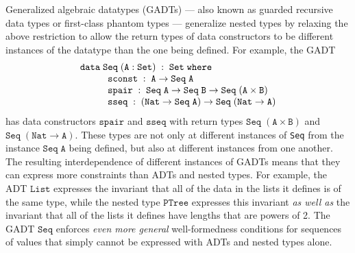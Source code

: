 \documentclass{lmcs}
\theoremstyle{plain}\newtheorem{satz}[thm]{Satz}
\begin{document}
Generalized algebraic datatypes (GADTs) --- also known as guarded
recursive data types or first-class phantom types --- generalize
nested types by relaxing the above restriction to allow the return
types of data constructors to be different instances of the datatype
than the one being defined. For example, the GADT {\small
\[\begin{array}{l}
\mathtt{data\; Seq \;(A : Set)\;:\;Set\;where}\\
\hspace*{0.4in}\mathtt{sconst\;:\; A \rightarrow Seq\;A}\\
\hspace*{0.4in}\mathtt{spair\;:\;Seq\;A \rightarrow Seq\;B \rightarrow
  Seq\;(A\times B)}\\
\hspace*{0.4in}\mathtt{sseq\;:\;(Nat \rightarrow Seq\;A) \rightarrow
  Seq\;(Nat \to A)}
\end{array}\]}
\noindent
\!\!has data constructors $\mathtt{spair}$ and $\mathtt{sseq}$ with
return types $\mathtt{Seq\; (A \times B)}$ and $\mathtt{Seq\;(Nat \to
  A)}$. These types are not only at different instances of \verb|Seq|
from the instance $\mathtt{Seq\; A}$ being defined, but also at
different instances from one another. The resulting interdependence of
different instances of GADTs means that they can express more
constraints than ADTs and nested types. For example, the ADT
$\mathtt{List}$ expresses the invariant that all of the data in the
lists it defines is of the same type, while the nested type
$\mathtt{PTree}$ expresses this invariant {\em as well as} the
invariant that all of the lists it defines have lengths that are
powers of 2. The GADT $\mathtt{Seq}$ enforces {\em even more general}
well-formedness conditions for sequences of values that simply cannot
be expressed with ADTs and nested types alone.
\end{document}
